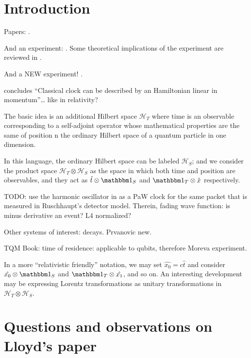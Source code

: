 \section{Introduction}

Papers: \cite{Lloyd:Time, Marletto:Evolution, Prvanovic, Maccone:Pauli, RealisticClocks}.


And an experiment: \cite{Moreva:synthetic,Moreva:illustration}.
Some theoretical implications of the experiment are reviewed in
\cite{LeggettGarg+PageWootters}.

And a NEW experiment! \parencite{Moreva_position}.

\iftodo
\cite{HarmonicClocks} concludes ``Classical clock can be described by an Hamiltonian linear in momentum''\dots
like in relativity?
\fi

The basic idea is an additional Hilbert space $\mathcal{H}_T$ where time is an observable
corresponding to
a self-adjoint operator whose mathematical properties are the same of position  n the
ordinary Hilbert space of a quantum particle in one dimension.

In this language, the ordinary Hilbert space can be labeled $\mathcal{H}_S$;
and we consider the product space $\mathcal{H}_T \otimes \mathcal{H}_S$ as
the space in which both time and position are observables, and they act as
$\hat{t} \otimes \idop_S$ and $\idop_T \otimes \hat{x}$
respectively.

\iftodo
TODO: use the harmonic oscillator in \cite{HarmonicClocks}
as a PaW clock for the same packet that is measured in
Ruschhaupt's detector model.
Therein, fading wave function: is minus derivative an event?
L4 normalized?

Other systems of interest: decays. Prvanovic new.

TQM Book: time of residence: applicable to qubits, therefore Moreva experiment.
\fi

\begin{remark}
  In a more ``relativistic friendly'' notation, we may set
  $\hat{x_0} = c\hat{t}$ and consider
  $\hat{x_0} \otimes \idop_S$ and $\idop_T \otimes \hat{x_1}$,
  and so on. An interesting development may be expressing
  Lorentz transformations as unitary transformations in
  $\mathcal{H}_T \otimes \mathcal{H}_S$.
\end{remark}

\iftodo

\section{Questions and observations on Lloyd's paper}

